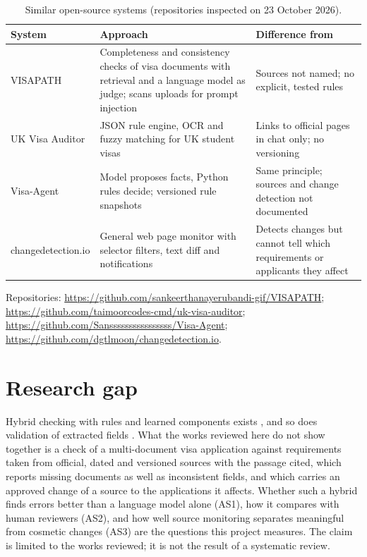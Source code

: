 \begin{table}[ht]
  \centering
  \small
  \caption{Similar open-source systems (repositories inspected on 23 October 2026).}
  \label{tab:similar}
  \begin{tabularx}{\textwidth}{@{}lXX@{}}
    \toprule
    System & Approach & Difference from \project{} \\
    \midrule
    VISAPATH &
      Completeness and consistency checks of visa documents with retrieval and a language
      model as judge; scans uploads for prompt injection &
      Sources not named; no explicit, tested rules \\
    UK Visa Auditor &
      JSON rule engine, OCR and fuzzy matching for UK student visas &
      Links to official pages in chat only; no versioning \\
    Visa-Agent &
      Model proposes facts, Python rules decide; versioned rule snapshots &
      Same principle; sources and change detection not documented \\
    changedetection.io &
      General web page monitor with selector filters, text diff and notifications &
      Detects changes but cannot tell which requirements or applicants they affect \\
    \bottomrule
  \end{tabularx}

  \raggedright\footnotesize Repositories: \url{https://github.com/sankeerthanayerubandi-gif/VISAPATH}; \url{https://github.com/taimoorcodes-cmd/uk-visa-auditor}; \url{https://github.com/Sanssssssssssssssss/Visa-Agent}; \url{https://github.com/dgtlmoon/changedetection.io}.
\end{table}

\section{Research gap}
Hybrid checking with rules and learned components exists \autocite{chen2026contradictions}, and
so does validation of extracted fields \autocite{bulatov2022identity}. What the works reviewed
here do not show together is a check of a multi-document visa application against requirements
taken from official, dated and versioned sources with the passage cited, which reports missing
documents as well as inconsistent fields, and which carries an approved change of a source to the
applications it affects. Whether such a hybrid finds errors better than a language model alone
(AS1), how it compares with human reviewers (AS2), and how well source monitoring separates
meaningful from cosmetic changes (AS3) are the questions this project measures. The claim is
limited to the works reviewed; it is not the result of a systematic review.
